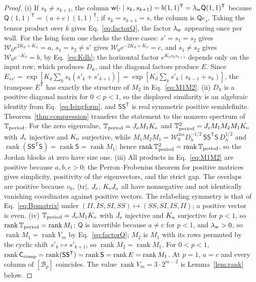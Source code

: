 \documentclass[aps,prx,reprint,superscriptaddress,nobibnotes,longbibliography]{revtex4-2}
\theoremstyle{remark}
\newcommand{\rk}{\operatorname{rank}}
\newcommand{\Ccomp}{\mathsf C_{\rm comp}}
\newcommand{\Tper}{\mathbb T_{\rm period}}
\begin{document}
\begin{proof}
(i) If $s_k\ne s_{k+1}$, the column $\mathsf w(\cdot\mid s_k,s_{k+1})=b(1,1)^{\mathsf T}=\lambda_{\rm w}\mathsf Q(1,1)^{\mathsf T}$ because $\mathsf Q(1,1)^{\mathsf T}=(a+c)(1,1)^{\mathsf T}$; if $s_k=s_{k+1}=s$, the column is $\mathsf Qe_s$.  Taking the tensor product over $k$ gives Eq.~\eqref{eq:factorQ}, the factor $\lambda_{\rm w}$ appearing once per wall.  For the Ising form one checks the three cases: $s'=s_1=s_2$ gives $\mathcal W_0e^{2K_d+K_h}=a$, $s_1=s_2\ne s'$ gives $\mathcal W_0e^{-2K_d+K_h}=c$, and $s_1\ne s_2$ gives $\mathcal W_0e^{-K_h}=b$, by Eq.~\eqref{eq:Kdh}; the horizontal factor $e^{K_hs_ks_{k+1}}$ depends only on the input row, which produces $D_h$, and the diagonal factors produce $E$.  Since $E_{ss'}=\exp[K_d\sum_ks_k(s'_k+s'_{k+1})]=\exp[K_d\sum_ks'_k(s_{k-1}+s_k)]$, the transpose $E^{\mathsf T}$ has exactly the structure of $M_2$ in Eq.~\eqref{eq:M1M2}.
(ii) $D_h$ is a positive diagonal matrix for $0<p<1$, so the displayed similarity is an algebraic identity from Eq.~\eqref{eq:Isingform}, and $\mathsf S\mathsf S^{\mathsf T}$ is real symmetric positive semidefinite.  Theorem~\ref{thm:compression} transfers the statement to the nonzero spectrum of $\Tper$.  For the zero eigenvalue, $\Tper=J_{\rm e}M_1K_{\rm o}$ and $\Tper^2=J_{\rm e}M_1M_2M_1K_{\rm o}$ with $J_{\rm e}$ injective and $K_{\rm o}$ surjective, while $M_1M_2M_1=\mathcal W_0^{3m}D_h^{-1/2}\,\mathsf S\mathsf S^{\mathsf T}\mathsf S\,D_h^{1/2}$ and $\rk(\mathsf S\mathsf S^{\mathsf T}\mathsf S)=\rk\mathsf S=\rk M_1$; hence $\rk\Tper^2=\rk\Tper$, so the Jordan blocks at zero have size one.
(iii) All products in Eq.~\eqref{eq:M1M2} are positive because $a,b,c>0$; the Perron--Frobenius theorem for positive matrices gives simplicity, positivity of the eigenvectors, and the strict gap.  The overlaps are positive because $v_0$, $\langle\mathrm{tr}|$, $J_{\rm e}$, $K_{\rm e}J_{\rm o}$ all have nonnegative and not identically vanishing coordinates against positive vectors.  The relabeling symmetry is that of Eq.~\eqref{eq:Bpmatrix} under $(II,IS,SI,SS)\mapsto(SS,SI,IS,II)$; a positive vector is even.
(iv) $\Tper=J_{\rm e}M_1K_{\rm o}$ with $J_{\rm e}$ injective and $K_{\rm o}$ surjective for $p<1$, so $\rk\Tper=\rk M_1$; $\mathsf Q$ is invertible because $a\ne c$ for $p<1$, and $\lambda_{\rm w}>0$, so $\rk M_1=\rk V_m$ by Eq.~\eqref{eq:factorQ}; $M_2$ is $M_1$ with its rows permuted by the cyclic shift $s'_k\mapsto s'_{k+1}$, so $\rk M_2=\rk M_1$.  For $0<p<1$, $\rk\Ccomp=\rk(\mathsf S\mathsf S^{\mathsf T})=\rk\mathsf S=\rk E=\rk M_1$.  At $p=1$, $a=c$ and every column of $[\mathcal B_p]$ coincides.  The value $\rk V_m=3\cdot2^{m-2}$ is Lemma~\ref{lem:rank} below.

\end{proof}
\end{document}
